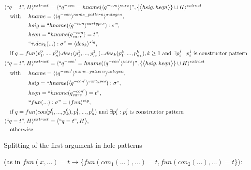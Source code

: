 \documentclass[11pt]{article} %
\begin{document}
\begin{alignat*}{3}
&\langle `` q = t ", H \rangle^{extract} = \langle `` q^{-con} = hname (\langle q^{-con} \rangle^{vars}) ", \{\big\langle hsig, heqn \big\rangle\} \cup H \rangle^{extract} \span\span \\
&\quad \textrm{with } && hname = \langle \langle q^{-con} \rangle^{name\_pattern} \rangle^{autogen}, \\
&\quad && hsig = `` hname(\langle q^{-con} \rangle^{vartypes}): \sigma ", \\
&\quad && heqn = `` hname(q^{-con}_{vars}) = t ", \\
&\quad && `` \tau.des_k(...): \sigma " = \langle des_k \rangle^{sig}, \\
&\quad \textrm{if } q = fun(p_1^0, ..., p_n^0).des_1(p_1^1, ..., p_{n_1}^1)...des_k(p_1^k, ..., p_{n_k}^k), k \geq 1 \textrm{ and } \exists p_i^j: p_i^j \textrm{ is constructor pattern} \span\span \\
&\langle `` q = t ", H \rangle^{extract} = \langle `` q^{-con'} = hname (\langle q^{-con'} \rangle^{vars}) ", \{\big\langle hsig, heqn \big\rangle\} \cup H \rangle^{extract} \span\span \\
&\quad \textrm{with } && hname = \langle \langle q^{-con'} \rangle^{name\_pattern} \rangle^{autogen}, \\
&\quad && hsig = `` hname(\langle q^{-con'} \rangle^{vartypes}): \sigma ", \\
&\quad && heqn = `` hname(q^{-con'}_{vars}) = t ", \\
&\quad && `` fun(...): \sigma " = \langle fun \rangle^{sig}, \\
&\quad \textrm{if } q = fun(con(p_1^0, ..., p_k^0), p^1_1, ..., p^1_n) \textrm{ and } \exists p_i^j: p_i^j \textrm{ is constructor pattern} \span\span \\
&\langle `` q = t ", H \rangle^{extract} = \big\langle `` q = t ", H \big\rangle, \span\span \\
&\quad \textrm{otherwise} \span\span
\end{alignat*}

Splitting of the first argument in hole patterns

(as in $fun(x,...) = t \rightarrow \{fun(con_1(...),...) = t, fun(con_2(...),...) = t\}$):
\end{document}
